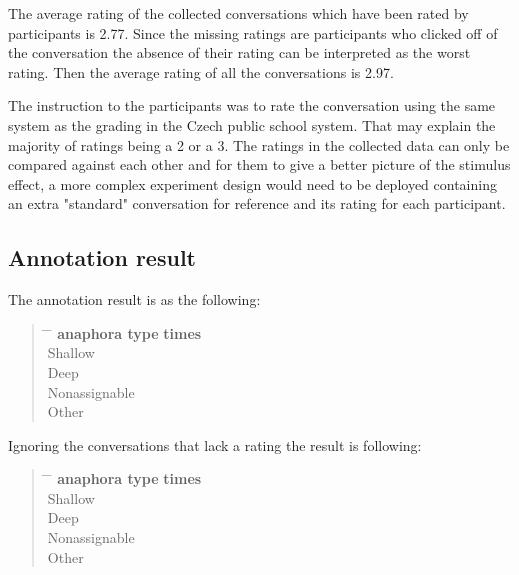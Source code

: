 The average rating of the collected conversations
which have been rated by participants is 2.77.
Since the missing ratings are participants who clicked off of the conversation
the absence of their rating can be interpreted as the worst rating.
Then the average rating of all the conversations is 2.97.

The instruction to the participants was to rate the conversation
using the same system as the grading in the Czech public school system.
That may explain the majority of ratings being a 2 or a 3.
The ratings in the collected data can only be compared against each other and
for them to give a better picture of the stimulus effect,
a more complex experiment design would need to be deployed
containing an extra "standard" conversation for reference and its rating for each participant.

\subsection{Annotation result}

The annotation result is as the following:

\begin{quote}
\begin{tabbing}
\hspace{4cm} \= \hspace{4cm} \= \kill %
\textbf{anaphora type} \> \textbf{times} \\
Shallow  \\
Deep  \\
Nonassignable  \\
Other 
\end{tabbing}
\end{quote}

Ignoring the conversations that lack a rating the result is following:

\begin{quote}
\begin{tabbing}
\hspace{4cm} \= \hspace{4cm} \= \kill %
\textbf{anaphora type} \> \textbf{times} \\
Shallow  \\
Deep  \\
Nonassignable  \\
Other 
\end{tabbing}
\end{quote}

